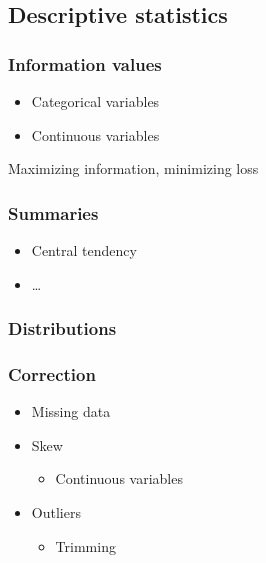 \documentclass[
]{article}
\providecommand{\tightlist}{%
  \setlength{\itemsep}{0pt}\setlength{\parskip}{0pt}}
\begin{document}
\hypertarget{descriptive-statistics}{%
\subsection{Descriptive statistics}\label{descriptive-statistics}}

\hypertarget{information-values}{%
\subsubsection{Information values}\label{information-values}}

\begin{itemize}
\tightlist
\item
  Categorical variables
\item
  Continuous variables
\end{itemize}

Maximizing information, minimizing loss

\hypertarget{summaries}{%
\subsubsection{Summaries}\label{summaries}}

\begin{itemize}
\tightlist
\item
  Central tendency
\item
  \ldots{}
\end{itemize}

\hypertarget{distributions}{%
\subsubsection{Distributions}\label{distributions}}

\hypertarget{correction}{%
\subsubsection{Correction}\label{correction}}

\begin{itemize}
\tightlist
\item
  Missing data
\item
  Skew

  \begin{itemize}
  \tightlist
  \item
    Continuous variables
  \end{itemize}
\item
  Outliers

  \begin{itemize}
  \tightlist
  \item
    Trimming
  \end{itemize}
\end{itemize}
\end{document}
